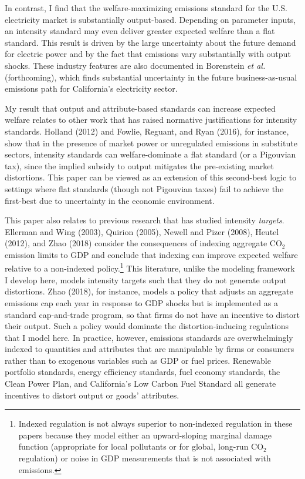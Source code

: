 \documentclass[12pt]{article}
\begin{document}
In contrast, I find that the welfare-maximizing emissions standard for the U.S. electricity market is substantially output-based. Depending on parameter inputs, an intensity standard may even deliver greater expected welfare than a flat standard. This result is driven by the large uncertainty about the future demand for electric power and by the fact that emissions vary substantially with output shocks. These industry features are also documented in Borenstein {\it et al.} (forthcoming), which finds substantial uncertainty in the future business-as-usual emissions path for California's electricity sector.

My result that output and attribute-based standards can increase expected welfare relates to other work that has raised normative justifications for intensity standards. Holland (2012) and Fowlie, Reguant, and Ryan (2016), for instance, show that in the presence of market power or unregulated emissions in substitute sectors, intensity standards can welfare-dominate a flat standard (or a Pigouvian tax), since the implied subsidy to output mitigates the pre-existing market distortions. This paper can be viewed as an extension of this second-best logic to settings where flat standards (though not Pigouvian taxes) fail to achieve the first-best due to uncertainty in the economic environment.

This paper also relates to previous research that has studied intensity {\it targets}. Ellerman and Wing (2003), Quirion (2005), Newell and Pizer (2008), Heutel (2012), and Zhao (2018) consider the consequences of indexing aggregate CO$_{\text{2}}$ emission limits to GDP and conclude that indexing can improve expected welfare relative to a non-indexed policy.\footnote{Indexed regulation is not always superior to non-indexed regulation in these papers because they model either an upward-sloping marginal damage function (appropriate for local pollutants or for global, long-run CO$_{\text{2}}$ regulation) or noise in GDP measurements that is not associated with emissions.} This literature, unlike the modeling framework I develop here, models intensity targets such that they do not generate output distortions. Zhao (2018), for instance, models a policy that adjusts an aggregate emissions cap each year in response to GDP shocks but is implemented as a standard cap-and-trade program, so that firms do not have an incentive to distort their output. Such a policy would dominate the distortion-inducing regulations that I model here. In practice, however, emissions standards are overwhelmingly indexed to quantities and attributes that are manipulable by firms or consumers rather than to exogenous variables such as GDP or fuel prices. Renewable portfolio standards, energy efficiency standards, fuel economy standards, the Clean Power Plan, and California's Low Carbon Fuel Standard all generate incentives to distort output or goods' attributes.
\end{document}
